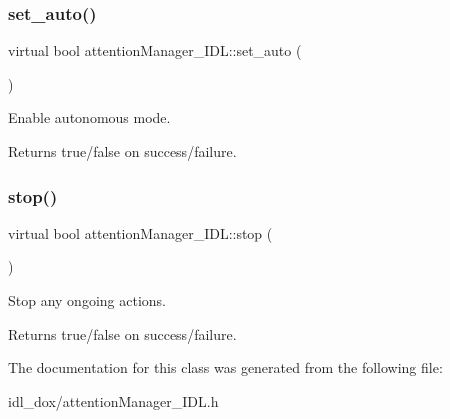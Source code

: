 \subsubsection{\texorpdfstring{set\_auto()}{set\_auto()}}
{\footnotesize\ttfamily virtual bool attention\+Manager\+\_\+\+I\+D\+L\+::set\+\_\+auto (\begin{DoxyParamCaption}{ }\end{DoxyParamCaption})\hspace{0.3cm}{\ttfamily [virtual]}}



Enable autonomous mode. 

\begin{DoxyReturn}{Returns}
true/false on success/failure. 
\end{DoxyReturn}
\mbox{\label{classattentionManager__IDL_aa5e3fb18a0336d8b65c316e7f6a675a8}} 
\subsubsection{\texorpdfstring{stop()}{stop()}}
{\footnotesize\ttfamily virtual bool attention\+Manager\+\_\+\+I\+D\+L\+::stop (\begin{DoxyParamCaption}{ }\end{DoxyParamCaption})\hspace{0.3cm}{\ttfamily [virtual]}}



Stop any ongoing actions. 

\begin{DoxyReturn}{Returns}
true/false on success/failure. 
\end{DoxyReturn}


The documentation for this class was generated from the following file\+:\begin{DoxyCompactItemize}
\item 
idl\+\_\+dox/attention\+Manager\+\_\+\+I\+D\+L.\+h\end{DoxyCompactItemize}
